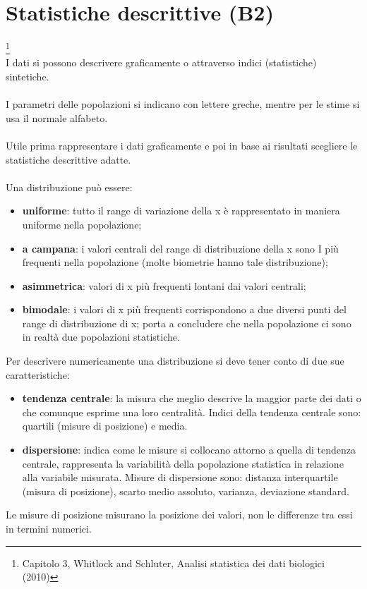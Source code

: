 \documentclass[10pt, draft]{book}
\newcommand{\tightlist}{%
\setlength{\itemsep}{1pt}\setlength{\parskip}{0pt}\setlength{\parsep}{0pt}}
\begin{document}
\chapter{Statistiche descrittive (B2)}\footnote{Capitolo 3, Whitlock and Schluter, Analisi statistica dei dati biologici (2010)}
\\
I dati si possono descrivere graficamente o attraverso indici (statistiche) sintetiche.
\\
\\
I parametri delle popolazioni si indicano con lettere greche, mentre per le stime si usa il normale alfabeto.
\\
\\
Utile prima rappresentare i dati graficamente e poi in base ai risultati scegliere le statistiche descrittive adatte.
\\
\\
Una distribuzione può essere:
\begin{itemize} \tightlist
    \item \textbf{uniforme}: tutto il range di variazione della x è rappresentato in maniera uniforme nella popolazione;
    \item \textbf{a campana}: i valori centrali del range di distribuzione della x sono I più frequenti nella popolazione (molte biometrie hanno tale distribuzione);
    \item \textbf{asimmetrica}: valori di x più frequenti lontani dai valori centrali;
    \item \textbf{bimodale}: i valori di x più frequenti corrispondono a due diversi punti del range di distribuzione di x; porta a concludere che nella popolazione ci sono in realtà due popolazioni statistiche.
\end{itemize}
Per descrivere numericamente una distribuzione si deve tener conto di due sue caratteristiche:
\begin{itemize} \tightlist
    \item \textbf{tendenza centrale}: la misura che meglio descrive la maggior parte dei dati o che comunque esprime una loro centralità. Indici della tendenza centrale sono: quartili (misure di posizione) e media.
    \item \textbf{dispersione}: indica come le misure si collocano attorno a quella di tendenza centrale, rappresenta la variabilità della popolazione statistica in relazione alla variabile misurata. Misure di dispersione sono: distanza interquartile (misura di posizione), scarto medio assoluto, varianza, deviazione standard.
\end{itemize}
Le misure di posizione misurano la posizione dei valori, non le differenze tra essi in termini numerici.
\end{document}
